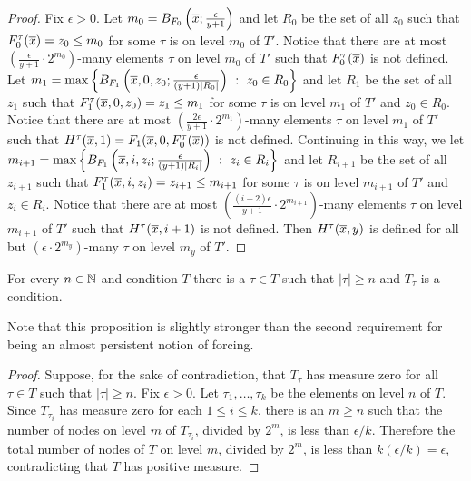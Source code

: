 \begin{proof}
Fix $\epsilon>0$.
Let $m_0=B_{F_0}\left(\overline{x};\frac{\epsilon}{y+1}\right)$ and let $R_0$ be the set of all
$z_0$ such that $F_0^\tau(\overline{x})=z_0\leq m_0$ for some $\tau$ is on level $m_0$ of $T'$.
Notice that there are at most $\left(\frac{\epsilon}{y+1}\cdot 2^{m_0}\right)$-many elements $\tau$ on level
$m_0$ of $T'$ such that $F_0^\tau(\overline{x})$ is not defined.
Let $m_1=\max\left\{B_{F_1}\left(\overline{x},0,z_0;\frac{\epsilon}{(y+1)|R_0|}\right)\ :\ z_0\in R_0\right\}$
and let $R_1$ be the set of all $z_1$ such that $F_1^\tau(\overline{x},0,z_0)=z_1\leq m_1$
for some $\tau$ is on level $m_1$ of $T'$ and $z_0\in R_0$.
Notice that there are at most $\left(\frac{2\epsilon}{y+1}\cdot 2^{m_1}\right)$-many elements $\tau$ on level
$m_1$ of $T'$ such that $H^\tau(\overline{x},1)=F_1(\overline{x},0,F_0^\tau(\overline{x}))$ is not defined.
Continuing in this way, we let
$m_{i+1}=\max\left\{B_{F_1}\left(\overline{x},i,z_i;\frac{\epsilon}{(y+1)|R_i|}\right)\ :\ z_i\in R_i\right\}$
and let $R_{i+1}$ be the set of all $z_{i+1}$ such that $F_1^\tau(\overline{x},i,z_i)=z_{i+1}\leq m_{i+1}$
for some $\tau$ is on level $m_{i+1}$ of $T'$ and $z_i\in R_i$.
Notice that there are at most $\left(\frac{(i+2)\epsilon}{y+1}\cdot 2^{m_{i+1}}\right)$-many elements $\tau$ on level
$m_{i+1}$ of $T'$ such that $H^\tau(\overline{x},i+1)$ is not defined.
Then $H^\tau(\overline{x},y)$ is defined for all
but $(\epsilon\cdot 2^{m_y})$-many $\tau$ on level $m_y$ of $T'$.
\end{proof}

\begin{prop}[\RCAo]\label{P:R:almostPersistent2}
For every $n\in\mathbb{N}$ and condition $T$ there is a $\tau\in T$ such that
$|\tau|\geq n$ and $T_\tau$ is a condition.
\end{prop}

Note that this proposition is slightly stronger
than the second requirement for being
an almost persistent notion of forcing.

\begin{proof}
Suppose, for the sake of contradiction, that $T_\tau$ has measure zero
for all $\tau\in T$ such that $|\tau|\geq n$.
Fix $\epsilon>0$.
Let $\tau_1,\ldots,\tau_k$ be the elements on level $n$ of $T$.
Since $T_{\tau_i}$ has measure zero for each $1\leq i\leq k$,
there is an $m\geq n$ such that the number of nodes on level $m$ of $T_{\tau_i}$,
divided by $2^m$, is less than $\epsilon/k$.
Therefore the total number of nodes of $T$ on level $m$, divided by $2^m$,
is less than $k(\epsilon/k)=\epsilon$,
contradicting that $T$ has positive measure.
\end{proof}

